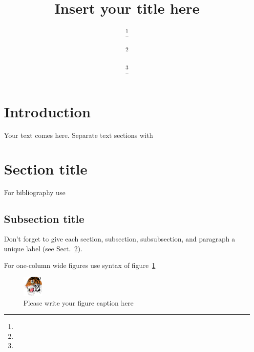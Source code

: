 \documentclass[twocolumn]{webofc}
\begin{document}
%
\title{Insert your title here}
%
%

\author{ \fnsep\thanks{} \and
         \fnsep\thanks{} \and
         \fnsep\thanks{}
}


%
\maketitle
%
\section{Introduction}
\label{intro}
Your text comes here. Separate text sections with
\section{Section title}
\label{sec-1}
For bibliography use \cite{RefJ}
\subsection{Subsection title}
\label{sec-2}
Don't forget to give each section, subsection, subsubsection, and
paragraph a unique label (see Sect.~\ref{sec-1}).

For one-column wide figures use syntax of figure~\ref{fig-1}
\begin{figure}[h]
\centering
\includegraphics[width=1cm,clip]{tiger}
\caption{Please write your figure caption here}
\label{fig-1}       %
\end{figure}
\end{document}
